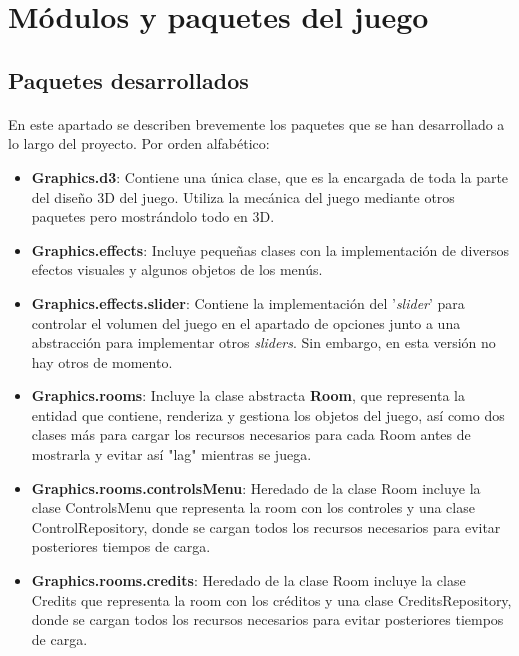 \documentclass[a4paper]{article}
\begin{document}
\section{Módulos y paquetes del juego}

\subsection{Paquetes desarrollados}

\paragraph{}En este apartado se describen brevemente los paquetes que se han desarrollado a lo largo del proyecto. Por orden alfabético:
\begin{itemize}
	\item \textbf{Graphics.d3}: Contiene una única clase, que es la encargada de toda la parte del diseño 3D del juego. Utiliza la mecánica del juego mediante otros paquetes pero mostrándolo todo en 3D.
	
	\item \textbf{Graphics.effects}: Incluye pequeñas clases con la implementación de diversos efectos visuales y algunos objetos de los menús.
	\item \textbf{Graphics.effects.slider}: Contiene la implementación del '\textit{slider}' para controlar el volumen del juego en el apartado de opciones junto a una abstracción para implementar otros \textit{sliders}. Sin embargo, en esta versión no hay otros de momento.
	
	\item \textbf{Graphics.rooms}: Incluye la clase abstracta \textbf{Room}, que representa la entidad que contiene, renderiza y gestiona los objetos del juego, así como dos clases más para cargar los recursos necesarios para cada Room antes de mostrarla y evitar así "lag" mientras se juega.
	
	\item \textbf{Graphics.rooms.controlsMenu}: Heredado de la clase Room incluye la clase ControlsMenu que representa la room con los controles y una clase ControlRepository, donde se cargan todos los recursos necesarios para evitar posteriores tiempos de carga.
	
	\item \textbf{Graphics.rooms.credits}: Heredado de la clase Room incluye la clase Credits que representa la room con los créditos y una clase  CreditsRepository, donde se cargan todos los recursos necesarios para evitar posteriores tiempos de carga.
	

\end{itemize}
\end{document}
